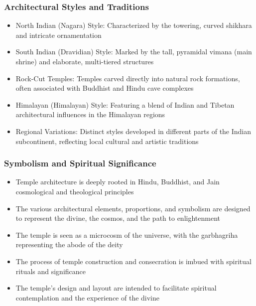 \begin{frame}[fragile]\frametitle{Architectural Styles and Traditions}
    \begin{itemize}
        \item North Indian (Nagara) Style: Characterized by the towering, curved shikhara and intricate ornamentation
        \item South Indian (Dravidian) Style: Marked by the tall, pyramidal vimana (main shrine) and elaborate, multi-tiered structures
        \item Rock-Cut Temples: Temples carved directly into natural rock formations, often associated with Buddhist and Hindu cave complexes
        \item Himalayan (Himalayan) Style: Featuring a blend of Indian and Tibetan architectural influences in the Himalayan regions
        \item Regional Variations: Distinct styles developed in different parts of the Indian subcontinent, reflecting local cultural and artistic traditions
    \end{itemize}
\end{frame}

\begin{frame}[fragile]\frametitle{Symbolism and Spiritual Significance}
    \begin{itemize}
        \item Temple architecture is deeply rooted in Hindu, Buddhist, and Jain cosmological and theological principles
        \item The various architectural elements, proportions, and symbolism are designed to represent the divine, the cosmos, and the path to enlightenment
        \item The temple is seen as a microcosm of the universe, with the garbhagriha representing the abode of the deity
        \item The process of temple construction and consecration is imbued with spiritual rituals and significance
        \item The temple's design and layout are intended to facilitate spiritual contemplation and the experience of the divine
    \end{itemize}
\end{frame}

